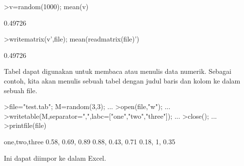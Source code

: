 \documentclass[12pt,arial,letterpaper]{book}
\begin{document}
\begin{eulercomment}
\begin{eulercomment}
\begin{eulercomment}
\begin{eulercomment}
\begin{eulercomment}
\begin{eulercomment}
\begin{eulercomment}
\begin{eulercomment}
\begin{eulercomment}
\begin{eulercomment}
\begin{eulercomment}
\begin{eulercomment}
\begin{eulercomment}
\begin{eulercomment}
\begin{eulercomment}
\begin{eulercomment}
\begin{eulercomment}
\begin{eulercomment}
\begin{eulercomment}
\begin{eulercomment}
\begin{eulercomment}
\begin{eulercomment}
\begin{eulercomment}
\begin{eulercomment}
\begin{eulercomment}
\begin{eulercomment}
\begin{eulercomment}
\begin{eulercomment}
\begin{eulercomment}
\begin{eulercomment}
\begin{eulercomment}
\begin{eulercomment}
\begin{eulercomment}
\begin{eulercomment}
\begin{eulercomment}
\begin{eulercomment}
\begin{eulercomment}
\begin{eulercomment}
\begin{eulercomment}
\end{eulercomment}
\begin{eulerprompt}
>v=random(1000); mean(v)
\end{eulerprompt}
\begin{euleroutput}
  0.49726
\end{euleroutput}
\begin{eulerprompt}
>writematrix(v',file); mean(readmatrix(file)')
\end{eulerprompt}
\begin{euleroutput}
  0.49726
\end{euleroutput}
\begin{eulercomment}
Tabel dapat digunakan untuk membaca atau menulis data numerik. Sebagai
contoh, kita akan menulis sebuah tabel dengan judul baris dan kolom ke
dalam sebuah file.
\end{eulercomment}
\begin{eulerprompt}
>file="test.tab"; M=random(3,3);  ...
>open(file,"w");  ...
>writetable(M,separator=",",labc=["one","two","three"]);  ...
>close(); ...
>printfile(file)
\end{eulerprompt}
\begin{euleroutput}
  one,two,three
        0.58,      0.69,      0.89
        0.88,      0.43,      0.71
        0.18,         1,      0.35
\end{euleroutput}
\begin{eulercomment}
Ini dapat diimpor ke dalam Excel.


\end{eulercomment}
\end{eulercomment}
\end{eulercomment}
\end{eulercomment}
\end{eulercomment}
\end{eulercomment}
\end{eulercomment}
\end{eulercomment}
\end{eulercomment}
\end{eulercomment}
\end{eulercomment}
\end{eulercomment}
\end{eulercomment}
\end{eulercomment}
\end{eulercomment}
\end{eulercomment}
\end{eulercomment}
\end{eulercomment}
\end{eulercomment}
\end{eulercomment}
\end{eulercomment}
\end{eulercomment}
\end{eulercomment}
\end{eulercomment}
\end{eulercomment}
\end{eulercomment}
\end{eulercomment}
\end{eulercomment}
\end{eulercomment}
\end{eulercomment}
\end{eulercomment}
\end{eulercomment}
\end{eulercomment}
\end{eulercomment}
\end{eulercomment}
\end{eulercomment}
\end{eulercomment}
\end{eulercomment}
\end{eulercomment}
\end{document}
